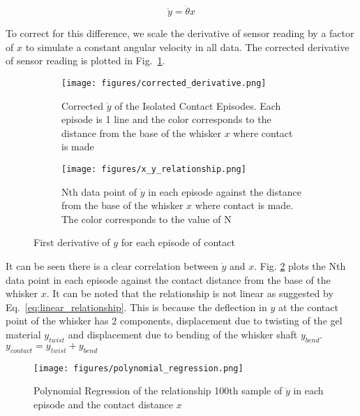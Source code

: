 \documentclass[runningheads]{llncs}
\begin{document}
\begin{equation}\label{eq:linear_relationship}
\dot{y} = \dot{\theta}x
\end{equation}

To correct for this difference, we scale the derivative of sensor reading by a factor of \(x\) to simulate a constant angular velocity in all data. The corrected derivative of sensor reading is plotted in Fig.~\ref{fig:corrected_derivative.png}.

\begin{figure}
    \centering
    \begin{subfigure}[t]{.48\textwidth}
        \centering
        \texttt{[image: figures/corrected\_derivative.png]}
        \caption{Corrected \(\dot{y}\) of the Isolated Contact Episodes. Each episode is 1 line and the color corresponds to the distance from the base of the whisker \(x\) where contact is made}
        \label{fig:corrected_derivative.png}
    \end{subfigure}
    \hspace{3pt}
    \begin{subfigure}[t]{.48\textwidth}
        \centering
        \texttt{[image: figures/x\_y\_relationship.png]}
        \caption{Nth data point of \(\dot{y}\) in each episode against the distance from the base of the whisker \(x\) where contact is made. The color corresponds to the value of N}
        \label{fig:x_y_relationship.png}
    \end{subfigure}
    \vspace{-5pt}
    \caption{First derivative of \(y\) for each episode of contact}
    \label{fig:episode_analysis}
\end{figure}


It can be seen there is a clear correlation between \(\dot{y}\) and \(x\). Fig. \ref*{fig:x_y_relationship.png} plots the Nth data point in each episode against the contact distance from the base of the whisker \(x\). It can be noted that the relationship is not linear as suggested by Eq.~\ref*{eq:linear_relationship}. This is because the deflection in \(y\) at the contact point of the whisker has 2 components, displacement due to twisting of the gel material \(y_{twist}\) and displacement due to bending of the whisker shaft \(y_{bend}\). \(y_{contact} = y_{twist} + y_{bend}\)

\begin{wrapfigure}{r}{.5\textwidth}
    \centering
    \texttt{[image: figures/polynomial\_regression.png]}
    \caption{Polynomial Regression of the relationship 100th sample of \(\dot{y}\) in each episode and the contact distance \(x\)}
    \label{fig:polynomial_regression.png}
\end{wrapfigure}
\end{document}
